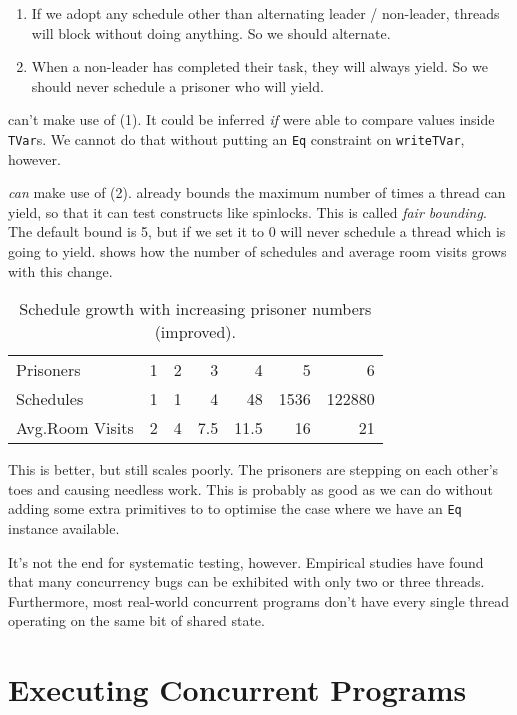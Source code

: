 \begin{enumerate}
\item If we adopt any schedule other than alternating leader /
  non-leader, threads will block without doing anything.  So we should
  alternate.
\item When a non-leader has completed their task, they will always
  yield.  So we should never schedule a prisoner who will yield.
\end{enumerate}

\dejafu{} can't make use of (1).  It could be inferred \emph{if}
\dejafu{} were able to compare values inside \verb|TVar|s.  We cannot
do that without putting an \verb|Eq| constraint on \verb|writeTVar|,
however.

\dejafu{} \emph{can} make use of (2).  \dejafu{} already bounds the
maximum number of times a thread can yield, so that it can test
constructs like spinlocks.  This is called \emph{fair bounding}.  The
default bound is 5, but if we set it to 0 \dejafu{} will never
schedule a thread which is going to yield.   shows how
the number of schedules and average room visits grows with this
change.

\begin{table}[t]
  \centering
  \begin{tabular}{l|rrrrrr} \toprule
    Prisoners          & 1 & 2 & 3   &  4   &    5 &      6 \\
    Schedules          & 1 & 1 & 4   & 48   & 1536 & 122880 \\
    Avg.\@ Room Visits & 2 & 4 & 7.5 & 11.5 &   16 &     21 \\ \bottomrule
  \end{tabular}
  \caption{Schedule growth with increasing prisoner numbers (improved).}\label{tbl:100fast}
\end{table}

This is better, but still scales poorly.  The prisoners are stepping
on each other's toes and causing needless work.  This is probably as
good as we can do without adding some extra primitives to \dejafu{} to
optimise the case where we have an \verb|Eq| instance available.

It's not the end for systematic testing, however.  Empirical
studies\cite{thomson2014} have found that many concurrency bugs can be
exhibited with only two or three threads.  Furthermore, most
real-world concurrent programs don't have every single thread
operating on the same bit of shared state.
\section{Executing Concurrent Programs}
\label{sec:dejafu-execution}

